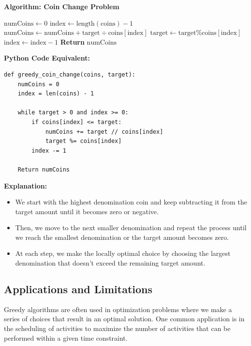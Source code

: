 \documentclass[12pt]{book} %
\begin{document}
\textbf{Algorithm: Coin Change Problem}
\FloatBarrier
\begin{algorithm}
\caption{Greedy Coin Change Algorithm}
\begin{algorithmic}[1]
    \State $\text{numCoins} \gets 0$
    \State $\text{index} \gets \text{length}(\text{coins}) - 1$
            \State $\text{numCoins} \gets \text{numCoins} + \text{target} \div \text{coins}[\text{index}]$
            \State $\text{target} \gets \text{target} \% \text{coins}[\text{index}]$
        \EndIf
        \State $\text{index} \gets \text{index} - 1$
    \EndWhile
    \State \textbf{Return} $\text{numCoins}$
\EndProcedure
\end{algorithmic}
\end{algorithm}
\FloatBarrier
\textbf{Python Code Equivalent:}
\FloatBarrier
\begin{lstlisting}
def greedy_coin_change(coins, target):
    numCoins = 0
    index = len(coins) - 1
    
    while target > 0 and index >= 0:
        if coins[index] <= target:
            numCoins += target // coins[index]
            target %= coins[index]
        index -= 1
        
    Return numCoins

\end{lstlisting}
\FloatBarrier
\textbf{Explanation:}
\begin{itemize}
    \item We start with the highest denomination coin and keep subtracting it from the target amount until it becomes zero or negative.
    \item Then, we move to the next smaller denomination and repeat the process until we reach the smallest denomination or the target amount becomes zero.
    \item At each step, we make the locally optimal choice by choosing the largest denomination that doesn't exceed the remaining target amount.
\end{itemize}

\subsection{Applications and Limitations}
Greedy algorithms are often used in optimization problems where we make a series of choices that result in an optimal solution. One common application is in the scheduling of activities to maximize the number of activities that can be performed within a given time constraint.
\end{document}
